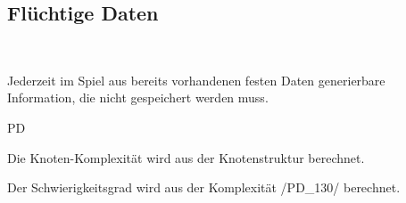 %
%


\subsection{Flüchtige Daten}~\\
\label{DT:fluechtDat}

Jederzeit im Spiel aus bereits vorhandenen festen Daten generierbare Information, die nicht gespeichert werden muss.



\begin{ids}{\gls{PD}}

	\id[130] Die Knoten-Komplexität wird aus der Knotenstruktur berechnet.
	
	\id[140] Der Schwierigkeitsgrad wird aus der Komplexität /PD\_130/ berechnet.
		

\end{ids}





